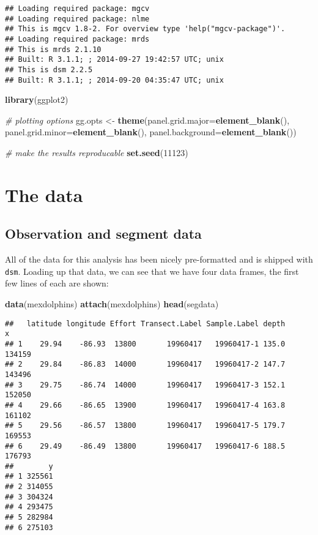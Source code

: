 \documentclass[]{article}
\newenvironment{Shaded}{}{}
\newcommand{\KeywordTok}[1]{\textcolor[rgb]{0.00,0.44,0.13}{\textbf{{#1}}}}
\newcommand{\DataTypeTok}[1]{\textcolor[rgb]{0.56,0.13,0.00}{{#1}}}
\newcommand{\DecValTok}[1]{\textcolor[rgb]{0.25,0.63,0.44}{{#1}}}
\newcommand{\StringTok}[1]{\textcolor[rgb]{0.25,0.44,0.63}{{#1}}}
\newcommand{\CommentTok}[1]{\textcolor[rgb]{0.38,0.63,0.69}{\textit{{#1}}}}
\newcommand{\NormalTok}[1]{{#1}}
\begin{document}
\begin{verbatim}
## Loading required package: mgcv
## Loading required package: nlme
## This is mgcv 1.8-2. For overview type 'help("mgcv-package")'.
## Loading required package: mrds
## This is mrds 2.1.10
## Built: R 3.1.1; ; 2014-09-27 19:42:57 UTC; unix
## This is dsm 2.2.5
## Built: R 3.1.1; ; 2014-09-20 04:35:47 UTC; unix
\end{verbatim}

\begin{Shaded}
\begin{Highlighting}[]
\KeywordTok{library}\NormalTok{(ggplot2)}

\CommentTok{# plotting options}
\NormalTok{gg.opts <-}\StringTok{ }\KeywordTok{theme}\NormalTok{(}\DataTypeTok{panel.grid.major=}\KeywordTok{element_blank}\NormalTok{(),}
                \DataTypeTok{panel.grid.minor=}\KeywordTok{element_blank}\NormalTok{(),}
                \DataTypeTok{panel.background=}\KeywordTok{element_blank}\NormalTok{())}

\CommentTok{# make the results reproducable}
\KeywordTok{set.seed}\NormalTok{(}\DecValTok{11123}\NormalTok{)}
\end{Highlighting}
\end{Shaded}

\section{The data}\label{the-data}

\subsection{Observation and segment
data}\label{observation-and-segment-data}

All of the data for this analysis has been nicely pre-formatted and is
shipped with \texttt{dsm}. Loading up that data, we can see that we have
four data frames, the first few lines of each are shown:

\begin{Shaded}
\begin{Highlighting}[]
\KeywordTok{data}\NormalTok{(mexdolphins)}
\KeywordTok{attach}\NormalTok{(mexdolphins)}
\KeywordTok{head}\NormalTok{(segdata)}
\end{Highlighting}
\end{Shaded}

\begin{verbatim}
##   latitude longitude Effort Transect.Label Sample.Label depth      x
## 1    29.94    -86.93  13800       19960417   19960417-1 135.0 134159
## 2    29.84    -86.83  14000       19960417   19960417-2 147.7 143496
## 3    29.75    -86.74  14000       19960417   19960417-3 152.1 152050
## 4    29.66    -86.65  13900       19960417   19960417-4 163.8 161102
## 5    29.56    -86.57  13800       19960417   19960417-5 179.7 169553
## 6    29.49    -86.49  13800       19960417   19960417-6 188.5 176793
##        y
## 1 325561
## 2 314055
## 3 304324
## 4 293475
## 5 282984
## 6 275103
\end{verbatim}
\end{document}
